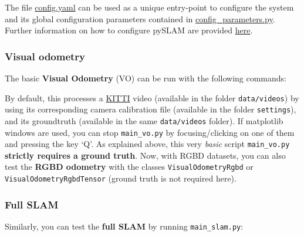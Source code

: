 \documentclass{article}
\newenvironment{Shaded}{\begin{snugshade}}{\end{snugshade}}
\newcommand{\BuiltInTok}[1]{\textcolor[rgb]{0.74,0.68,0.62}{#1}}
\newcommand{\CommentTok}[1]{\textcolor[rgb]{0.00,0.40,1.00}{\textbf{\textit{#1}}}}
\newcommand{\ExtensionTok}[1]{\textcolor[rgb]{0.74,0.68,0.62}{#1}}
\newcommand{\NormalTok}[1]{\textcolor[rgb]{0.74,0.68,0.62}{#1}}
\begin{document}
The file \href{./config.yaml}{config.yaml} can be used as a unique
entry-point to configure the system and its global configuration
parameters contained in
\href{./config_parameters.py}{config\_parameters.py}. Further
information on how to configure pySLAM are provided
\protect\hyperlink{selecting-a-dataset-and-different-configuration-parameters}{here}.


\hypertarget{visual-odometry}{%
\subsubsection{Visual odometry}\label{visual-odometry}}

The basic \textbf{Visual Odometry} (VO) can be run with the following
commands:

\begin{scriptsize}
\begin{Shaded}
\end{Shaded}
\end{scriptsize}


By default, this processes a
\href{http://www.cvlibs.net/datasets/kitti/eval_odometry.php}{KITTI}
video (available in the folder \texttt{data/videos}) by using its
corresponding camera calibration file (available in the folder
\texttt{settings}), and its groundtruth (available in the same
\texttt{data/videos} folder). If matplotlib windows are used, you can
stop \texttt{main\_vo.py} by focusing/clicking on one of them and
pressing the key `Q'. As explained above, this very \emph{basic} script
\texttt{main\_vo.py} \textbf{strictly requires a ground truth}. Now,
with RGBD datasets, you can also test the \textbf{RGBD odometry} with
the classes \texttt{VisualOdometryRgbd} or
\texttt{VisualOdometryRgbdTensor} (ground truth is not required here).

\hypertarget{full-slam}{%
\subsubsection{Full SLAM}\label{full-slam}}

Similarly, you can test the \textbf{full SLAM} by running
\texttt{main\_slam.py}:\\
\end{document}
